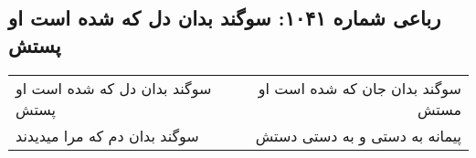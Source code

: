 \begin{center}
\section*{رباعی شماره ۱۰۴۱: سوگند بدان دل که شده است او پستش}
\label{sec:1041}
\begin{longtable}{l p{0.5cm} r}
سوگند بدان دل که شده است او پستش
&&
سوگند بدان جان که شده است او مستش
\\
سوگند بدان دم که مرا میدیدند
&&
پیمانه به دستی و به دستی دستش
\\
\end{longtable}
\end{center}
